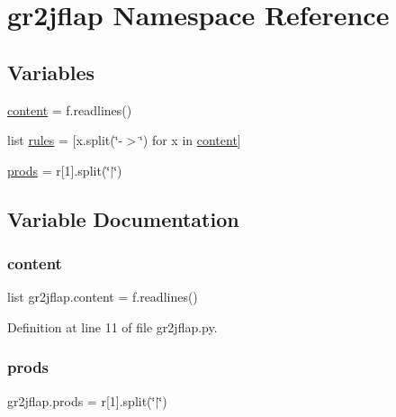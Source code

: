 \hypertarget{namespacegr2jflap}{}\section{gr2jflap Namespace Reference}
\label{namespacegr2jflap}
\subsection*{Variables}
\begin{DoxyCompactItemize}
\item 
\hyperlink{namespacegr2jflap_a1b05b532957a71dfe47067d02b219a20}{content} = f.\+readlines()
\item 
list \hyperlink{namespacegr2jflap_a1f275e6ae4855de88fee6d6f262d6476}{rules} = \mbox{[}x.\+split(\char`\"{}-\/$>$\char`\"{}) for x in \hyperlink{namespacegr2jflap_a1b05b532957a71dfe47067d02b219a20}{content}\mbox{]}
\item 
\hyperlink{namespacegr2jflap_a1d104f150a51f8bb479bc9265ba1e21b}{prods} = r\mbox{[}1\mbox{]}.split(\char`\"{}$\vert$\char`\"{})
\end{DoxyCompactItemize}


\subsection{Variable Documentation}
\mbox{\label{namespacegr2jflap_a1b05b532957a71dfe47067d02b219a20}} 
\subsubsection{\texorpdfstring{content}{content}}
{\footnotesize\ttfamily list gr2jflap.\+content = f.\+readlines()}



Definition at line 11 of file gr2jflap.\+py.

\mbox{\label{namespacegr2jflap_a1d104f150a51f8bb479bc9265ba1e21b}} 
\subsubsection{\texorpdfstring{prods}{prods}}
{\footnotesize\ttfamily gr2jflap.\+prods = r\mbox{[}1\mbox{]}.split(\char`\"{}$\vert$\char`\"{})}



